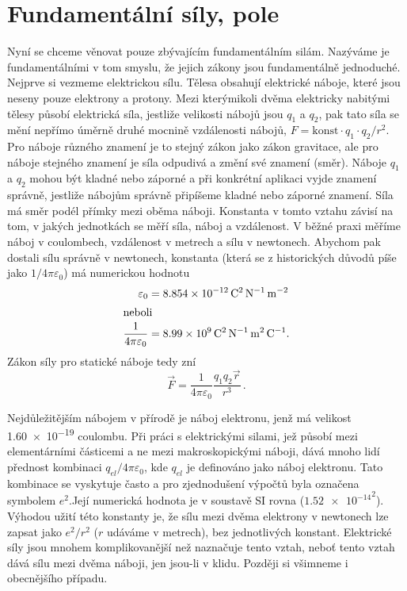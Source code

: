 {  \section{Fundamentální síly, pole}\label{fyz:IchapXIIsecIV}
    Nyní se chceme věnovat pouze zbývajícím fundamentálním silám. Nazýváme je fundamentálními v tom 
    smyslu, že jejich zákony jsou fundamentálně jednoduché. Nejprve si vezmeme elektrickou sílu. 
    Tělesa obsahují elektrické náboje, které jsou neseny pouze elektrony a protony. Mezi 
    kterýmikoli dvěma elektricky nabitými tělesy působí elektrická síla, jestliže velikosti nábojů 
    jsou \(q_1\) a \(q_2\), pak tato síla se mění nepřímo úměrně druhé mocnině vzdálenosti nábojů, 
    \(F=\text{konst}\cdot q_1\cdot q_2/r^2\). Pro náboje různého znamení je to stejný zákon jako 
    zákon gravitace, ale pro náboje stejného znamení je síla odpudivá a změní své znamení (směr). 
    Náboje \(q_1\) a \(q_2\) mohou být kladné nebo záporné a při konkrétní aplikaci vyjde znamení 
    správně, jestliže nábojům správně připíšeme kladné nebo záporné znamení. Síla má směr podél 
    přímky mezi oběma náboji. Konstanta v tomto vztahu závisí na tom, v jakých jednotkách se měří 
    síla, náboj a vzdálenost. V běžné praxi měříme náboj v coulombech, vzdálenost v metrech a sílu 
    v newtonech. Abychom pak dostali sílu správně v newtonech, konstanta (která se z historických 
    důvodů píše jako \(1/4\pi\varepsilon_0\)) má numerickou hodnotu
    \begin{subequations}
    \label{FYZ:eq170}
      \begin{align}
        \varepsilon_0 
          &= \SI{8.854e-12}{\square\coulomb\per\newton\per\square\m}          \label{FYZ:eq170a} \\
        \shortintertext{neboli}
        \frac{1}{4\pi\varepsilon_0} 
          &= \SI{8.99e9}{\square\coulomb\per\newton\square\m\per\coulomb}.    \label{FYZ:eq170b}
      \end{align}
    \end{subequations}
    Zákon síly pro statické náboje tedy zní
    \begin{equation}\label{FYZ:eq171}
      \boxed{\vec{F} = \frac{1}{4\pi\varepsilon_0}\frac{q_1q_2\vec{r}}{r^3}}\,. 
    \end{equation}
    
    Nejdůležitějším nábojem v přírodě je náboj elektronu, jenž má velikost \num{1.60e-19} coulombu. 
    Při práci s elektrickými silami, jež působí mezi elementárními částicemi a ne mezi 
    makroskopickými náboji, dává mnoho lidí přednost kombinaci \(q_{el}/4\pi\varepsilon_0\), kde 
    \(q_{el}\) je definováno jako náboj elektronu. Tato kombinace se vyskytuje často a pro 
    zjednodušení výpočtů byla označena symbolem \(e^2\).Její numerická hodnota je v soustavě SI 
    rovna (\(\num{1.52e-14}^2\)). Výhodou užití této konstanty je, že sílu mezi dvěma elektrony v 
    newtonech lze zapsat jako \(e^2/r^2\) (\(r\) udáváme v metrech), bez jednotlivých konstant. 
    Elektrické síly jsou mnohem komplikovanější než naznačuje tento vztah, neboť tento vztah dává 
    sílu mezi dvěma náboji, jen jsou-li v klidu. Později si všimneme i obecnějšího případu.
  
}
